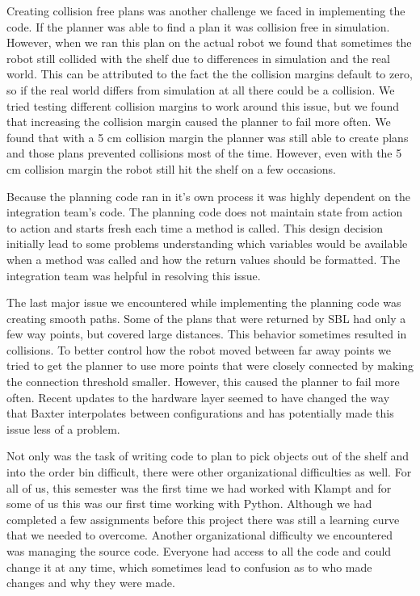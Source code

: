 \documentclass[12pt]{article}
\begin{document}
Creating collision free plans was another challenge we faced in implementing the code. If the planner was able to find a plan it was collision free in simulation. However, when we ran this plan on the actual robot we found that sometimes the robot still collided with the shelf due to differences in simulation and the real world. This can be attributed to the fact the the collision margins default to zero, so if the real world differs from simulation at all there could be a collision. We tried testing different collision margins to work around this issue, but we found that increasing the collision margin caused the planner to fail more often. We found that with a 5 cm collision margin the planner was still able to create plans and those plans prevented collisions most of the time. However, even with the 5 cm collision margin the robot still hit the shelf on a few occasions.

Because the planning code ran in it's own process it was highly dependent on the integration team's code. The planning code does not maintain state from action to action and starts fresh each time a method is called. This design decision initially lead to some problems understanding which variables would be available when a method was called and how the return values should be formatted. The integration team was helpful in resolving this issue.

The last major issue we encountered while implementing the planning code was creating smooth paths. Some of the plans that were returned by SBL had only a few way points, but covered large distances. This behavior sometimes resulted in collisions. To better control how the robot moved between far away points we tried to get the planner to use more points that were closely connected by making the connection threshold smaller. However, this caused the planner to fail more often. Recent updates to the hardware layer seemed to have changed the way that Baxter interpolates between configurations and has potentially made this issue less of a problem.

Not only was the task of writing code to plan to pick objects out of the shelf and into the order bin difficult, there were other organizational difficulties as well. For all of us, this semester was the first time we had worked with Klampt and for some of us this was our first time working with Python. Although we had completed a few assignments before this project there was still a learning curve that we needed to overcome. Another organizational difficulty we encountered was managing the source code. Everyone had access to all the code and could change it at any time, which sometimes lead to confusion as to who made changes and why they were made.
\end{document}
